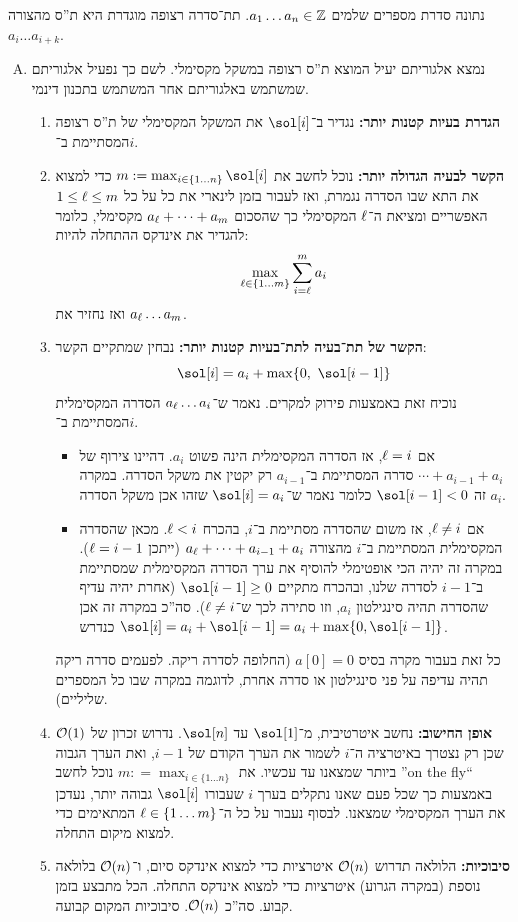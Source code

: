 \documentclass[]{../../../../tex/classes/homework}
\begin{document}
\section{}%
	נתונה סדרת מספרים שלמים $a_1 \dots a_n \in \mathbb{Z}$. תת־סדרה רצופה מוגדרת היא ת''ס מהצורה $a_i \dots a_{i + k}$. 
	\begin{enumerate}[(A)]
		\item נמצא אלגוריתם יעיל המוצא ת''ס רצופה במשקל מקסימלי. לשם כך נפעיל אלגוריתם שמשתמש באלגוריתם אחר המשתמש בתכנון דינמי. 
		\begin{enumerate}[1.]
			\item \textbf{הגדרת בעיות קטנות יותר: }נגדיר ב־$\sol[i]$ את המשקל המקסימלי של ת''ס רצופה המסתיימת ב־$i$. 
			\item \textbf{הקשר לבעיה הגדולה יותר: }נוכל לחשב את $m := \max_{i \in \{1  \dots n\}}\sol[i]$ כדי למצוא את התא שבו הסדרה נגמרת, ואז לעבור בזמן לינארי את כל על כל $1 \le \ell \le m$ האפשריים ומציאת ה־$\ell$ המקסימלי כך שהסכום $a_\ell + \cdots + a_m$ מקסימלי, כלומר להגדיר את אינדקס ההתחלה להיות: 
			\[ \max_{{\ell \in \{1 \dots m\}}} \sum_{i = \ell}^{m}a_i \]
			ואז נחזיר את $a_\ell \dots a_m$. 
			\item \textbf{הקשר של תת־בעיה לתת־בעיות קטנות יותר: }נבחין שמתקיים הקשר: 
			\[ \sol[i] = a_i + \max\{0, \ \sol[i - 1]\} \]
			נוכיח זאת באמצעות פירוק למקרים. נאמר ש־$a_\ell \dots a_i$ הסדרה המקסימלית המסתיימת ב־$i$. 
			\begin{itemize}
				\item אם $\ell = i$, אז הסדרה המקסימלית הינה פשוט $a_i$. דהיינו צירוף של $\cdots + a_{i - 1} + a_i$ סדרה המסתיימת ב־$a_{i - 1}$ רק יקטין את משקל הסדרה. במקרה זה $\sol[i - 1] < 0$ כלומר נאמר ש־$\sol[i] = a_i$ שזהו אכן משקל הסדרה $a_i$. 
				\item אם $\ell \neq i$, אז משום שהסדרה מסתיימת ב־$i$, בהכרח $\ell < i$. מכאן שהסדרה המקסימלית המסתיימת ב־$i$ מהצורה $a_\ell + \cdots + a_{i - 1} + a_i$ (ייתכן $\ell = i - 1$). במקרה זה יהיה הכי אופטימלי להוסיף את ערך הסדרה המקסימלית שמסתיימת ב־$i - 1$ לסדרה שלנו, ובהכרח מתקיים $\sol[i - 1] \ge 0$ (אחרת יהיה עדיף שהסדרה תהיה סינגילטון $a_i$, וזו סתירה לכך ש־$\ell \ne i$). סה''כ במקרה זה אכן $\sol[i] = a_i + \sol[i - 1] = a_i + \max\{0, \sol[i - 1]\}$ כנדרש. 
			\end{itemize}
			כל זאת בעבור מקרה בסיס $a[0] = 0$ (החלופה לסדרה ריקה. לפעמים סדרה ריקה תהיה עדיפה על פני סינגילטון או סדרה אחרת, לדוגמה במקרה שבו כל המספרים שליליים). 
			\item \textbf{אופן החישוב: }נחשב איטרטיבית, מ־$\sol[1]$ עד $\sol[n]$. נדרוש זכרון של $\mathcal{O}(1)$ שכן רק נצטרך באיטרציה ה־$i$ לשמור את הערך הקודם של $i - 1$, ואת הערך הגבוה ביותר שמצאנו עד עכשיו. את $m: =\max_{i \in \{1 \dots n\}}$ נוכל לחשב ''on the fly`` באמצעות כך שכל פעם שאנו נתקלים בערך $i$ שעבורו $\sol[i]$ גבוהה יותר, נעדכן את הערך המקסימלי שמצאנו. לבסוף נעבור על כל ה־$\ell \in \{1 \dots m\}$ המתאימים כדי למצוא מיקום התחלה. 
			\item \textbf{סיבוכיות: }הלולאה תדרוש $\mathcal{O}(n)$ איטרציות כדי למצוא אינדקס סיום, ו־$\mathcal{O}(n)$ בלולאה נוספת (במקרה הגרוע) איטרציות כדי למצוא אינדקס התחלה. הכל מתבצע בזמן קבוע. סה''כ $\mathcal{O}(n)$. סיבוכיות המקום קבועה. 
		\end{enumerate}
			

\end{enumerate}
\end{document}
